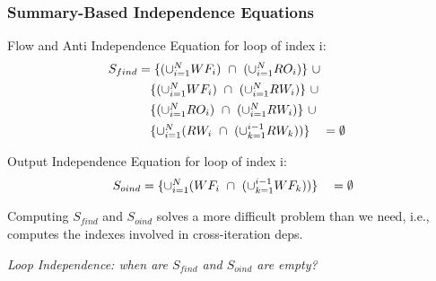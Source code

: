 \documentclass{beamer}
\renewcommand{\emph}[1]{\textcolor{structure}{#1}}
\newcommand{\emp}[1]{\textcolor{DikuRed}{ #1}}
\begin{document}
\begin{frame}[fragile,t]
  \frametitle{Summary-Based Independence Equations}
\bigskip
Flow and Anti Independence Equation for loop of index \emph{i}:
\begin{equation} \label{FIEq} 
\begin{array}{l r}
S_{find} = \{(\cup_{i=1}^{N} WF_i) \mbox{ }\cap\mbox{ } (\cup_{i=1}^{N} RO_i)\} \mbox{ }\cup & \vspace{1ex} \\ \mbox{ }\mbox{ }\mbox{ }\mbox{ }\mbox{ }\mbox{ }\mbox{ }\mbox{ }\mbox{ }\mbox{ }
\{(\cup_{i=1}^{N} WF_i) \mbox{ }\cap\mbox{ } (\cup_{i=1}^{N} RW_i)\} \mbox{ }\cup & \vspace{1ex} \\ \mbox{ }\mbox{ }\mbox{ }\mbox{ }\mbox{ }\mbox{ }\mbox{ }\mbox{ }\mbox{ }\mbox{ }
\{(\cup_{i=1}^{N}RO_i) \mbox{ }\cap\mbox{ } (\cup_{i=1}^{N}RW_i)\} \mbox{ }\cup  & \vspace{1ex} \\ \mbox{ }\mbox{ }\mbox{ }\mbox{ }\mbox{ }\mbox{ }\mbox{ }\mbox{ }\mbox{ }\mbox{ }
\{ \cup_{i=1}^{N}(RW_i \mbox{ }\cap\mbox{ } (\cup_{k=1}^{i-1}RW_k))\} \mbox{ }\mbox{ }\mbox{ } = \emptyset
\end{array}
\end{equation}

\bigskip

Output Independence Equation for loop of index \emph{i}:
\begin{equation} \label{OIEq} 
\begin{array}{l r}
S_{oind} = \{ \cup_{i=1}^{N}(WF_i \mbox{ }\cap\mbox{ } (\cup_{k=1}^{i-1}WF_k))\} \mbox{ }\mbox{ }\mbox{ } = \emptyset
\end{array}
\end{equation}

\bigskip

Computing $S_{find}$ and $S_{oind}$ solves a more difficult problem than we need, 
i.e., computes the indexes involved in cross-iteration deps. \bigskip

\emp{{\em Loop Independence: when are $S_{find}$ and $S_{oind}$ are empty?}}

\end{frame}
\end{document}
